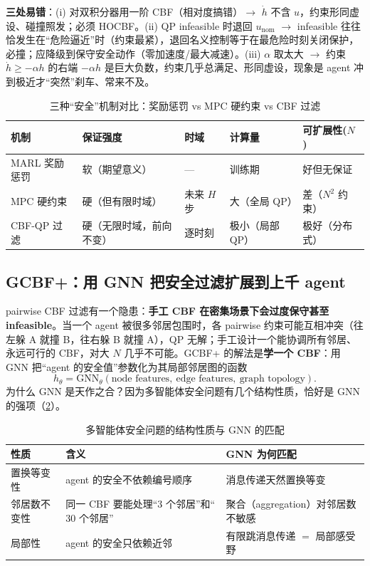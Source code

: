 \noindent\textbf{三处易错}：(i) 对双积分器用一阶 CBF（相对度搞错）$\to$ $\dot h$ 不含 $u$，约束形同虚设、碰撞照发；必须 HOCBF。(ii) QP infeasible 时退回 $u_{\text{nom}}$ $\to$ infeasible 往往恰发生在“危险逼近”时（约束最紧），退回名义控制等于在最危险时刻关闭保护，必撞；应降级到保守安全动作（零加速度/最大减速）。(iii) $\alpha$ 取太大 $\to$ 约束 $\dot h\ge-\alpha h$ 的右端 $-\alpha h$ 是巨大负数，约束几乎总满足、形同虚设，现象是 agent 冲到极近才“突然”刹车、常来不及。

\begin{table}[H]\centering\small
\caption{三种“安全”机制对比：奖励惩罚 vs MPC 硬约束 vs CBF 过滤}
\label{tab:mh-safety-compare}
\begin{tabular}{p{2.6cm}p{2.8cm}p{2.4cm}p{2.2cm}p{2.4cm}}
\toprule
机制 & 保证强度 & 时域 & 计算量 & 可扩展性($N$) \\
\midrule
MARL 奖励惩罚 & 软（期望意义） & --- & 训练期 & 好但无保证 \\
MPC 硬约束 & 硬（但有限时域） & 未来 $H$ 步 & 大（全局 QP） & 差（$N^2$ 约束） \\
CBF-QP 过滤 & 硬（无限时域，前向不变） & 逐时刻 & 极小（局部 QP） & 极好（分布式） \\
\bottomrule
\end{tabular}
\end{table}

\subsection{GCBF+：用 GNN 把安全过滤扩展到上千 agent}
\label{sec:mh-gcbfplus}

pairwise CBF 过滤有一个隐患：\textbf{手工 CBF 在密集场景下会过度保守甚至 infeasible}。当一个 agent 被很多邻居包围时，各 pairwise 约束可能互相冲突（往左躲 A 就撞 B，往右躲 B 就撞 A），QP 无解；手工设计一个能协调所有邻居、永远可行的 CBF，对大 $N$ 几乎不可能。GCBF+\cite{zhang2025gcbfplus} 的解法是\textbf{学一个 CBF}：用 GNN 把“agent 的安全值”参数化为其局部邻居图的函数
\begin{equation}
  h_\theta=\mathrm{GNN}_\theta(\text{node features},\ \text{edge features},\ \text{graph topology}).
  \label{eq:mh-gcbf}
\end{equation}
为什么 GNN 是天作之合？因为多智能体安全问题有几个结构性质，恰好是 GNN 的强项（\cref{tab:mh-gnn-match}）。

\begin{table}[H]\centering\small
\caption{多智能体安全问题的结构性质与 GNN 的匹配}
\label{tab:mh-gnn-match}
\begin{tabular}{p{2.6cm}p{5.0cm}p{4.2cm}}
\toprule
性质 & 含义 & GNN 为何匹配 \\
\midrule
置换等变性 & agent 的安全不依赖编号顺序 & 消息传递天然置换等变 \\
邻居数不变性 & 同一 CBF 要能处理“$3$ 个邻居”和“$30$ 个邻居” & 聚合（aggregation）对邻居数不敏感 \\
局部性 & agent 的安全只依赖近邻 & 有限跳消息传递 $=$ 局部感受野 \\
\bottomrule
\end{tabular}
\end{table}

